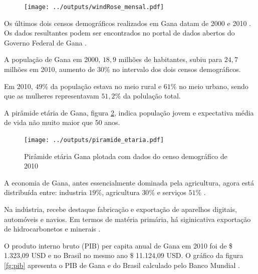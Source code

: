 \begin{figure}[H]
  \centering
  \texttt{[image: ../outputs/windRose\_mensal.pdf]}
  \caption{ \citep{carslaw2012} \label{fig:windRose_mensal}}
\end{figure}



Os últimos dois censos demográficos realizados em Gana datam
de 2000 \citep{ghanacensus2003} e 2010 \citep{ghanacensus2013}. Os
dados resultantes podem ser encontrados no portal de dados abertos
do Governo Federal de Gana \citep{opendataghana}.

A população de Gana em 2000, $18,9$ milhões de habitantes, subiu para $24,7$ 
milhões em 2010, aumento de $30\%$ no intervalo dos dois censos demográficos.

Em 2010, $49\%$ da população estava no meio rural e $61\%$ no meio urbano, sendo
que as mulheres representavam $51,2\%$ da polulação total.

A pirâmide etária de Gana, figura \ref{fig:piramedegana}, indica população 
jovem e expectativa média de vida não muito maior que 50 anos. 

\begin{figure}[H]
  \centering
  \texttt{[image: ../outputs/piramide\_etaria.pdf]}
  \caption{Pirâmide etária Gana plotada com dados do censo 
           demográfico de 2010 \citep{ghanacensus2013} \label{fig:piramedegana}}
\end{figure}

A economia de Gana, antes essencialmente dominada pela agricultura, 
agora está distribuída entre: industria $19\%$, agricultura $30\%$ 
e serviços $51\%$ \citep{ghanacensus2013}.

Na indústria, recebe destaque fabricação e exportação de aparelhos digitais, 
automóveis e navios. Em termos de matéria primária, há siginicativa 
exportação de hidrocarbonetos e minerais \citep{ghanacensus2013}.

O produto interno bruto (PIB) per capita anual de Gana em 2010 foi
de \$ 1.323,09 USD e no Brasil no mesmo ano \$ 11.124,09 USD.
O gráfico da figura \ref{fg:pib} apresenta o PIB de Gana e do Brasil 
calculado pelo Banco Mundial \citep{bancomundial}.

